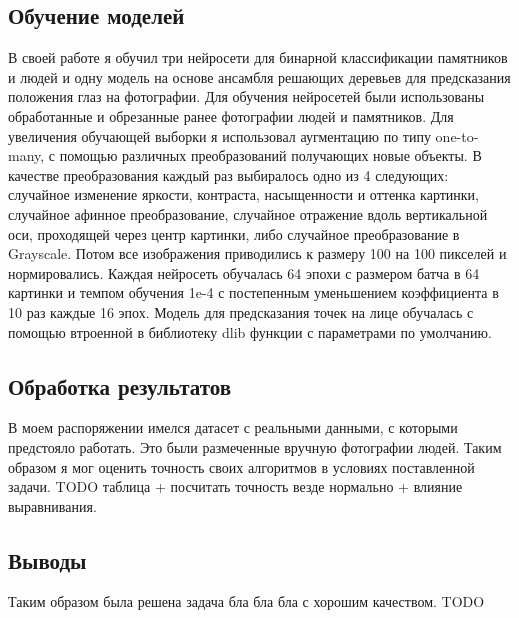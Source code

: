 \documentclass[a4paper,14pt]{extarticle}
\begin{document}
    \subsection{Обучение моделей}
    В своей работе я обучил три нейросети для бинарной классификации памятников и людей и одну модель на основе ансамбля решающих деревьев для предсказания положения глаз на фотографии.
    Для обучения нейросетей были использованы обработанные и обрезанные ранее фотографии людей и памятников. Для увеличения обучающей выборки я использовал аугментацию по типу one-to-many, с помощью различных преобразований получающих новые объекты. В качестве преобразования каждый раз выбиралось одно из 4 следующих: случайное изменение яркости, контраста, насыщенности и оттенка картинки, случайное афинное преобразование, случайное отражение вдоль вертикальной оси, проходящей через центр картинки, либо случайное преобразование в Grayscale. Потом все изображения приводились к размеру 100 на 100 пикселей и нормировались.
    Каждая нейросеть обучалась 64 эпохи с размером батча в 64 картинки и темпом обучения 1e-4 с постепенным уменьшением коэффициента в 10 раз каждые 16 эпох.
    Модель для предсказания точек на лице обучалась с помощью втроенной в библиотеку dlib функции с параметрами по умолчанию.

    \subsection{Обработка результатов}
    В моем распоряжении имелся датасет с реальными данными, с которыми предстояло работать. Это были размеченные вручную фотографии людей. Таким образом я мог оценить точность своих алгоритмов в условиях поставленной задачи. TODO таблица + посчитать точность везде нормально + влияние выравнивания.

    \subsection{Выводы}
    Таким образом была решена задача бла бла бла с хорошим качеством. TODO

    \newpage
\end{document}
